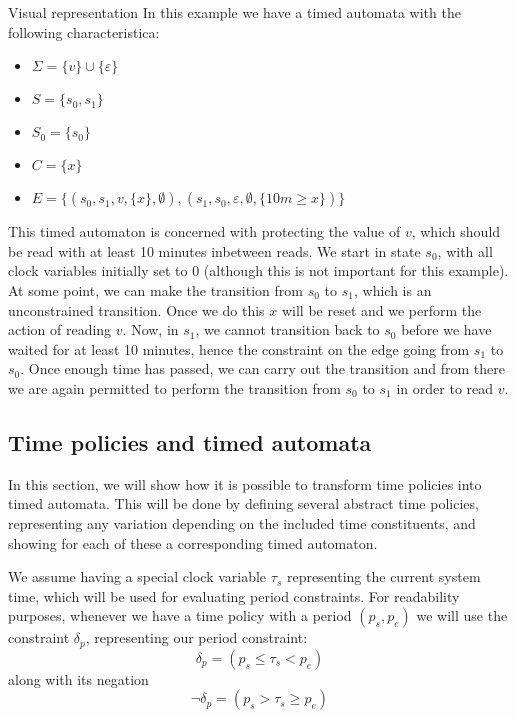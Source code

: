 \begin{example}{Visual representation}\label{time:ex:visualrepresentation}
In this example we have a timed automata with the following characteristica:
\begin{itemize}
  \item $\Sigma = \{ v \} \cup \{ \varepsilon \}$
  \item $S = \{ s_0, s_1 \}$
  \item $S_0 = \{ s_0 \}$
  \item $C = \{ x \}$
  \item $E = \{ (s_0, s_1, v, \{ x \}, \emptyset), (s_1, s_0, \varepsilon, \emptyset, \{ 10m \geq x \})\}$
\end{itemize}
This timed automaton is concerned with protecting the value of $v$, which should be read with at least 10 minutes inbetween reads.
We start in state $s_0$, with all clock variables initially set to $0$ (although this is not important for this example).
At some point, we can make the transition from $s_0$ to $s_1$, which is an unconstrained transition.
Once we do this $x$ will be reset and we perform the action of reading $v$.
Now, in $s_1$, we cannot transition back to $s_0$ before we have waited for at least 10 minutes, hence the constraint on the edge going from $s_1$ to $s_0$.
Once enough time has passed, we can carry out the transition and from there we are again permitted to perform the transition from $s_0$ to $s_1$ in order to read $v$.

  \begin{figure}[H]
    \centering
    
  \end{figure}
\end{example}

\subsection{Time policies and timed automata}\label{automata:timepolicies}
In this section, we will show how it is possible to transform \thelang{} time policies into timed automata.
This will be done by defining several abstract time policies, representing any variation depending on the included time constituents, and showing for each of these a corresponding timed automaton.

We assume having a special clock variable $\tau_s$ representing the current system time, which will be used for evaluating period constraints.
For readability purposes, whenever we have a time policy with a period $(p_s, p_e)$ we will use the constraint $\delta_p$, representing our period constraint:
\[ \delta_p = (p_s \leq \tau_s < p_e) \]
along with its negation
\[ \lnot\delta_p = (p_s > \tau_s \geq p_e) \]

